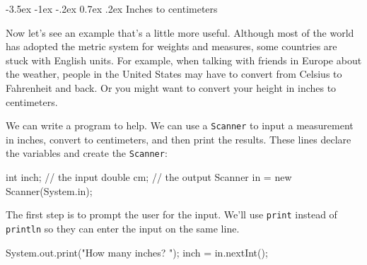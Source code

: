 \documentclass[12pt]{book}
\makeatletter
\renewcommand{\section}{\@startsection {section}{1}{\z@}%
    {-3.5ex \@plus -1ex \@minus -.2ex}%
    {0.7ex \@plus.2ex}%
    {\normalfont\Large\bfseries}}
\theoremstyle{exercise}
\newcommand{\java}[1]{\lstinline{#1}} %
\makeatother
\begin{document}
\section{Inches to centimeters}

Now let's see an example that's a little more useful.
Although most of the world has adopted the metric system for weights and measures, some countries are stuck with English units.
For example, when talking with friends in Europe about the weather, people in the United States may have to convert from Celsius to Fahrenheit and back.
Or you might want to convert your height in inches to centimeters.


We can write a program to help.
We can use a \java{Scanner} to input a measurement in inches, convert to centimeters, and then print the results.
These lines declare the variables and create the \java{Scanner}:



\begin{code}
    int inch;  // the input
    double cm;  // the output
    Scanner in = new Scanner(System.in);
\end{code}

The first step is to prompt the user for the input.
We'll use \java{print} instead of \java{println} so they can enter the input on the same line.

\begin{code}
    System.out.print("How many inches? ");
    inch = in.nextInt();
\end{code}
\end{document}
